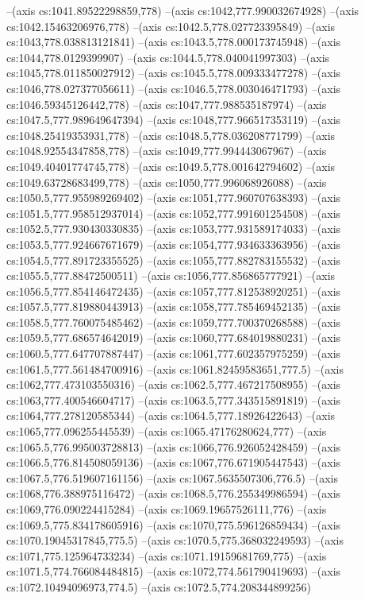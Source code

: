 --(axis cs:1041.89522298859,778)
--(axis cs:1042,777.990032674928)
--(axis cs:1042.15463206976,778)
--(axis cs:1042.5,778.027723395849)
--(axis cs:1043,778.038813121841)
--(axis cs:1043.5,778.000173745948)
--(axis cs:1044,778.0129399907)
--(axis cs:1044.5,778.040041997303)
--(axis cs:1045,778.011850027912)
--(axis cs:1045.5,778.009333477278)
--(axis cs:1046,778.027377056611)
--(axis cs:1046.5,778.003046471793)
--(axis cs:1046.59345126442,778)
--(axis cs:1047,777.988535187974)
--(axis cs:1047.5,777.989649647394)
--(axis cs:1048,777.966517353119)
--(axis cs:1048.25419353931,778)
--(axis cs:1048.5,778.036208771799)
--(axis cs:1048.92554347858,778)
--(axis cs:1049,777.994443067967)
--(axis cs:1049.40401774745,778)
--(axis cs:1049.5,778.001642794602)
--(axis cs:1049.63728683499,778)
--(axis cs:1050,777.996068926088)
--(axis cs:1050.5,777.955989269402)
--(axis cs:1051,777.960707638393)
--(axis cs:1051.5,777.958512937014)
--(axis cs:1052,777.991601254508)
--(axis cs:1052.5,777.930430330835)
--(axis cs:1053,777.931589174033)
--(axis cs:1053.5,777.924667671679)
--(axis cs:1054,777.934633363956)
--(axis cs:1054.5,777.891723355525)
--(axis cs:1055,777.882783155532)
--(axis cs:1055.5,777.88472500511)
--(axis cs:1056,777.856865777921)
--(axis cs:1056.5,777.854146472435)
--(axis cs:1057,777.812538920251)
--(axis cs:1057.5,777.819880443913)
--(axis cs:1058,777.785469452135)
--(axis cs:1058.5,777.760075485462)
--(axis cs:1059,777.700370268588)
--(axis cs:1059.5,777.686574642019)
--(axis cs:1060,777.684019880231)
--(axis cs:1060.5,777.647707887447)
--(axis cs:1061,777.602357975259)
--(axis cs:1061.5,777.561484700916)
--(axis cs:1061.82459583651,777.5)
--(axis cs:1062,777.473103550316)
--(axis cs:1062.5,777.467217508955)
--(axis cs:1063,777.400546604717)
--(axis cs:1063.5,777.343515891819)
--(axis cs:1064,777.278120585344)
--(axis cs:1064.5,777.18926422643)
--(axis cs:1065,777.096255445539)
--(axis cs:1065.47176280624,777)
--(axis cs:1065.5,776.995003728813)
--(axis cs:1066,776.926052428459)
--(axis cs:1066.5,776.814508059136)
--(axis cs:1067,776.671905447543)
--(axis cs:1067.5,776.519607161156)
--(axis cs:1067.5635507306,776.5)
--(axis cs:1068,776.388975116472)
--(axis cs:1068.5,776.255349986594)
--(axis cs:1069,776.090224415284)
--(axis cs:1069.19657526111,776)
--(axis cs:1069.5,775.834178605916)
--(axis cs:1070,775.596126859434)
--(axis cs:1070.19045317845,775.5)
--(axis cs:1070.5,775.368032249593)
--(axis cs:1071,775.125964733234)
--(axis cs:1071.19159681769,775)
--(axis cs:1071.5,774.766084484815)
--(axis cs:1072,774.561790419693)
--(axis cs:1072.10494096973,774.5)
--(axis cs:1072.5,774.208344899256)
